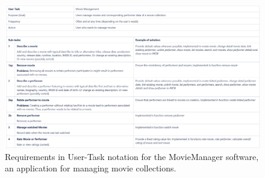 \newpage
{}
\begin{landscape}

\begin{figure}
	\centering
	\includegraphics[scale=0.57]{../images/MovieManager.png} 
	\caption{Requirements in User-Task notation for the MovieManager software, an application for managing movie collections.}
	\label{fig:mm}
\end{figure}

\end{landscape}
\restoregeometry


